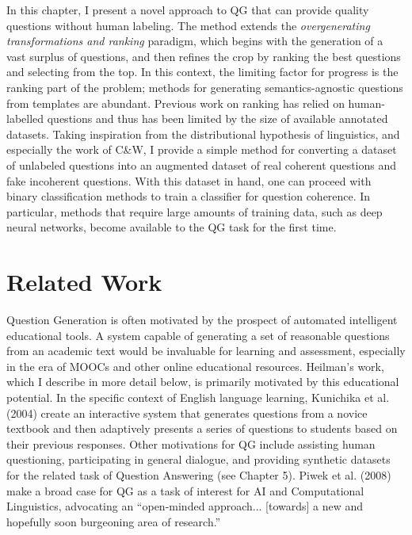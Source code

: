 In this chapter, I present a novel approach to QG that can provide quality questions without human labeling. The method extends the \textit{overgenerating transformations and ranking} paradigm, which begins with the generation of a vast surplus of questions, and then refines the crop by ranking the best questions and selecting from the top. In this context, the limiting factor for progress is the ranking part of the problem; methods for generating semantics-agnostic questions from templates are abundant. Previous work on ranking has relied on human-labelled questions and thus has been limited by the size of available annotated datasets. Taking inspiration from the distributional hypothesis of linguistics, and especially the work of C\&W, I provide a simple method for converting a dataset of unlabeled questions into an augmented dataset of real coherent questions and fake incoherent questions. With this dataset in hand, one can proceed with binary classification methods to train a classifier for question coherence. In particular, methods that require large amounts of training data, such as deep neural networks, become available to the QG task for the first time. 

\section{Related Work}

Question Generation is often motivated by the prospect of automated intelligent educational tools. A system capable of generating a set of reasonable questions from an academic text would be invaluable for learning and assessment, especially in the era of MOOCs and other online educational resources. Heilman's work, which I describe in more detail below, is primarily motivated by this educational potential. In the specific context of English language learning, Kunichika et al. (2004) create an interactive system that generates questions from a novice textbook and then adaptively presents a series of questions to students based on their previous responses. Other motivations for QG include assisting human questioning, participating in general dialogue, and providing synthetic datasets for the related task of Question Answering (see Chapter 5). Piwek et al. (2008) make a broad case for QG as a task of interest for AI and Computational Linguistics, advocating an ``open-minded approach... [towards] a new and hopefully soon burgeoning area of research.''

